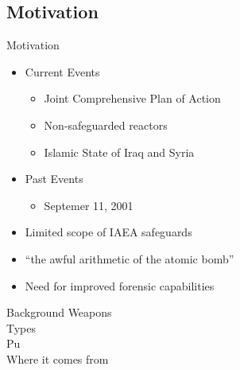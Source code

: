 \documentclass{beamer}
\begin{document}
\subsection{Motivation}
\begin{frame}{Motivation}
  \begin{itemize}
  \item{Current Events}
    \begin{itemize}
    \item{Joint Comprehensive Plan of Action}
    \item{Non-safeguarded reactors}
    \item{Islamic State of Iraq and Syria}
    \end{itemize}
  \item{Past Events}
    \begin{itemize}
    \item{Septemer 11, 2001}
    \end{itemize}
  \item{Limited scope of IAEA safeguards}
  \item{``the awful arithmetic of the atomic bomb''}
  \item{Need for improved forensic capabilities}
  \end{itemize}
\end{frame}


\begin{frame}{Background}
  Weapons\\
  Types\\
  Pu\\
  Where it comes from\\
\end{frame}
\end{document}
